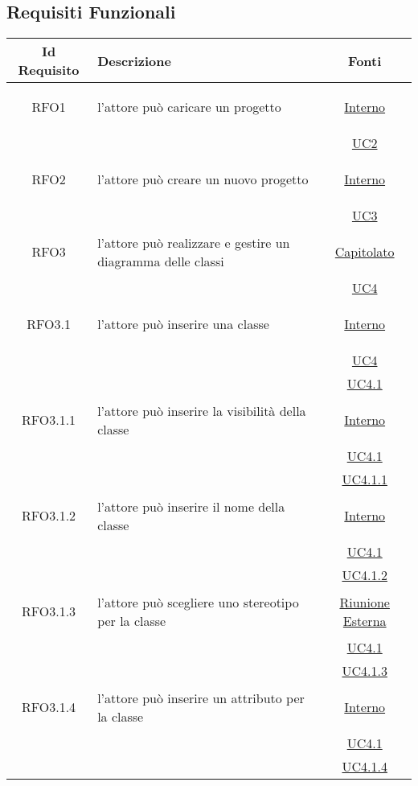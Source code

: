 \subsection{Requisiti Funzionali}
\normalsize
\begin{longtable}{|c|>{\centering}m{7cm}|c|}
\hline 
\textbf{Id Requisito} & \textbf{Descrizione} & \textbf{Fonti}\\
\hline
\endhead
\hypertarget{RFO1}{RFO1} & l'attore può caricare un progetto &  \hyperlink{Interno}{Interno}\\
& & \hyperref[UC2]{UC2}\\ \hline

\hypertarget{RFO2}{RFO2} & l'attore può creare un nuovo progetto &  \hyperlink{Interno}{Interno}\\
& & \hyperref[UC3]{UC3}\\ \hline

\hypertarget{RFO3}{RFO3} & l'attore può realizzare e gestire un diagramma delle classi & \hyperlink{Capitolato}{Capitolato}\\
& & \hyperref[UC4]{UC4}\\ \hline

\hypertarget{RFO3.1}{RFO3.1} & l'attore può inserire una classe &  \hyperlink{Interno}{Interno}\\
& &\hyperref[UC4]{UC4}\\
& &\hyperref[UC4.1]{UC4.1}\\ \hline

\hypertarget{RFO3.1.1}{RFO3.1.1} & l'attore può inserire la visibilità della classe & \hyperlink{Interno}{Interno}\\
& &\hyperref[UC4.1]{UC4.1}\\
& &\hyperref[UC4.1.1]{UC4.1.1}\\ \hline

\hypertarget{RFO3.1.2}{RFO3.1.2} & l'attore può inserire il nome della classe & \hyperlink{Interno}{Interno}\\
& &\hyperref[UC4.1]{UC4.1}\\
& &\hyperref[UC4.1.2]{UC4.1.2}\\ \hline

\hypertarget{RFO3.1.3}{RFO3.1.3} & l'attore può scegliere uno stereotipo per la classe & \hyperlink{Riunione Esterna}{Riunione Esterna}\\
& &\hyperref[UC4.1]{UC4.1}\\
& &\hyperref[UC4.1.3]{UC4.1.3}\\ \hline

\hypertarget{RFO3.1.4}{RFO3.1.4} & l'attore può inserire un attributo per la classe & \hyperlink{Interno}{Interno}\\
& &\hyperref[UC4.1]{UC4.1}\\
& &\hyperref[UC4.1.4]{UC4.1.4}\\ \hline


\end{longtable}
